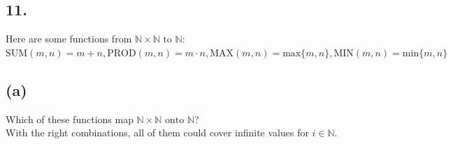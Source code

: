 \documentclass[11pt]{article}
\begin{document}
\subsection*{11.}
\begin{center}
Here are some functions from $\mathbb{N} \times \mathbb{N} \text{ to } \mathbb{N}$:\\
$\text{SUM}(m,n) = m + n, \text{PROD}(m,n) = m \cdot n, \text{MAX}(m,n) = \text{max}\{m,n\}, \text{MIN}(m,n) = \text{min}\{m,n\}$
\end{center}

\subsection*{(a)}
\begin{center}
Which of these functions map $\mathbb{N} \times \mathbb{N} \text{ onto } \mathbb{N}$?\\
\hfill \break
With the right combinations, all of them could cover infinite values for $i \in \mathbb{N}$.
\end{center}
\end{document}
